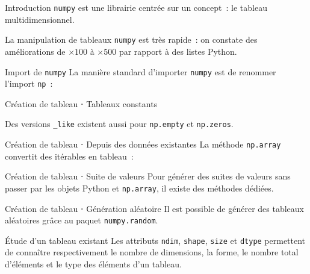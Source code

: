 \begin{frame}{Introduction}
  \texttt{numpy} est une librairie centrée sur un concept~: le tableau multidimensionnel.

  La manipulation de tableaux \texttt{numpy} est très rapide~: on constate des améliorations de $\times 100$ à $\times 500$ par rapport à des listes Python.
\end{frame}

\begin{frame}{Import de \texttt{numpy}}
  La manière standard d'importer \texttt{numpy} est de renommer l'import \texttt{np}~:

\end{frame}

\begin{frame}{Création de tableau ⋅ Tableaux constants}

  Des versions \texttt{\_like} existent aussi pour \texttt{np.empty} et \texttt{np.zeros}.
\end{frame}

\begin{frame}{Création de tableau ⋅ Depuis des données existantes}
  La méthode \texttt{np.array} convertit des itérables en tableau~:

\end{frame}

\begin{frame}{Création de tableau ⋅ Suite de valeurs}
  Pour générer des suites de valeurs sans passer par les objets Python et \texttt{np.array}, il existe des méthodes dédiées.
\end{frame}

\begin{frame}{Création de tableau ⋅ Génération aléatoire}
  Il est possible de générer des tableaux aléatoires grâce au paquet \texttt{numpy.random}.
\end{frame}

\begin{frame}{Étude d'un tableau existant}
  Les attributs \texttt{ndim}, \texttt{shape}, \texttt{size} et \texttt{dtype} permettent de connaître respectivement le nombre de dimensions, la forme, le nombre total d'éléments et le type des éléments d'un tableau.
\end{frame}


